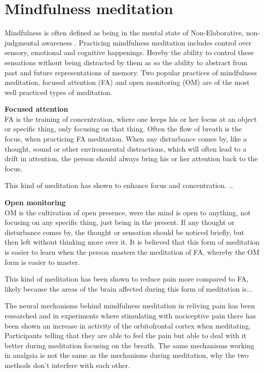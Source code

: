 \section{Mindfulness meditation}
Mindfulness is often defined as being in the mental state of Non-Elaborative, non-judgmental awareness \cite{Zeidan2012,Zeidan2016}. 
Practicing mindfulness meditation includes control over sensory, emotional and cognitive happenings. Hereby the ability to control these sensations without being distracted by them as so the ability to abstract from past and future representations of memory.
Two popular practices of mindfulness meditation, focused attention (FA) and open monitoring (OM) are of the most well practiced types of meditation. \cite{Zeidan2016}

\textbf{Focused attention}\\ 
FA is the training of concentration, where one keeps his or her focus at an object or specific thing, only focusing on that thing. Often the flow of breath is the focus, when practicing FA meditation.  When any disturbance comes by, like a thought, sound or other environmental distractions, which will often lead to a drift in attention, the person should always bring his or her attention back to the focus. \cite{Zeidan2016}

This kind of meditation has shown to enhance focus and concentration. ..

\textbf{Open monitoring}\\
OM is the cultivation of open presence, were the mind is open to anything, not focusing on any specific thing, just being in the present. If any thought or disturbance comes by, the thought or sensation should be noticed briefly, but then left without thinking more over it. It is believed that this form of meditation is easier to learn when the person masters the meditation of FA, whereby the OM form is easier to master. \cite{Zeidan2016}

This kind of meditation has been shown to reduce pain more compared to FA, likely because the areas of the brain affected during this form of meditation is...\cite{Perlman2010}

The neural mechanisms behind mindfulness meditation in reliving pain has been researched and in experiments where stimulating with nociceptive pain there has been shown an increase in activity of the orbitofrontal cortex when meditating. Participants telling that they are able to feel the pain but able to deal with it better during meditation focusing on the breath. 
The same mechanisms working in analgsia is not the same as the mechanisms during meditation, why the two methods don't interfere with each other. \cite{Jacob2016}

